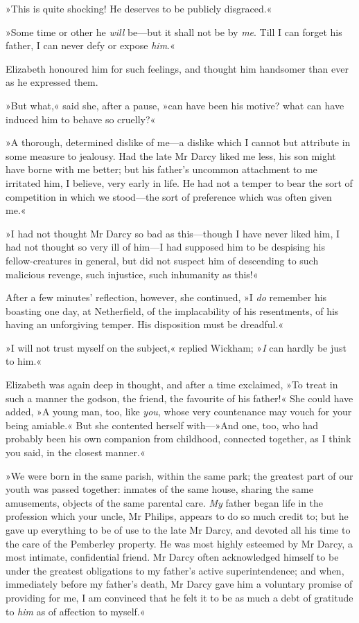 »This is quite shocking! He deserves to be publicly disgraced.«

»Some time or other he \textit{will} be—but it shall not be by \textit{me}. Till I can forget his father, I can never defy or expose \textit{him}.«

Elizabeth honoured him for such feelings, and thought him handsomer than ever as he expressed them.

»But what,« said she, after a pause, »can have been his motive? what can have induced him to behave so cruelly?«

»A thorough, determined dislike of me—a dislike which I cannot but attribute in some measure to jealousy. Had the late Mr Darcy liked me less, his son might have borne with me better; but his father's uncommon attachment to me irritated him, I believe, very early in life. He had not a temper to bear the sort of competition in which we stood—the sort of preference which was often given me.«

»I had not thought Mr Darcy so bad as this—though I have never liked him, I had not thought so very ill of him—I had supposed him to be despising his fellow-creatures in general, but did not suspect him of descending to such malicious revenge, such injustice, such inhumanity as this!«

After a few minutes' reflection, however, she continued, »I \textit{do} remember his boasting one day, at Netherfield, of the implacability of his resentments, of his having an unforgiving temper. His disposition must be dreadful.«

»I will not trust myself on the subject,« replied Wickham; »\textit{I} can hardly be just to him.«

Elizabeth was again deep in thought, and after a time exclaimed, »To treat in such a manner the godson, the friend, the favourite of his father!« She could have added, »A young man, too, like \textit{you}, whose very countenance may vouch for your being amiable.« But she contented herself with—»And one, too, who had probably been his own companion from childhood, connected together, as I think you said, in the closest manner.«

»We were born in the same parish, within the same park; the greatest part of our youth was passed together: inmates of the same house, sharing the same amusements, objects of the same parental care. \textit{My} father began life in the profession which your uncle, Mr Philips, appears to do so much credit to; but he gave up everything to be of use to the late Mr Darcy, and devoted all his time to the care of the Pemberley property. He was most highly esteemed by Mr Darcy, a most intimate, confidential friend. Mr Darcy often acknowledged himself to be under the greatest obligations to my father's active superintendence; and when, immediately before my father's death, Mr Darcy gave him a voluntary promise of providing for me, I am convinced that he felt it to be as much a debt of gratitude to \textit{him} as of affection to myself.«

